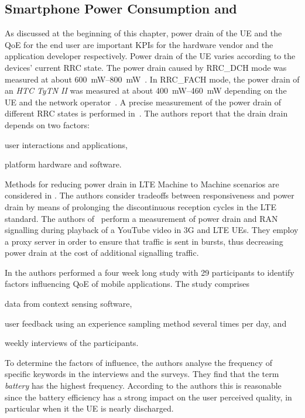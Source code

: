 \subsection{Smartphone Power Consumption and }\label{sec:network:background:energy_consumption_qoe}
As discussed at the beginning of this chapter, power drain of the \gls{UE} and the \gls{QoE} for the end user are important \glspl{KPI} for the hardware vendor and the application developer respectively.
Power drain of the \gls{UE} varies according to the devices' current \gls{RRC} state.
The power drain caused by \gls{RRC_DCH} mode was measured at about \SIrange{600}{800}{\milli\watt}~\cite{Qian2011a,Qian2010a}.
In \gls{RRC_FACH} mode, the power drain of an \emph{HTC TyTN II} was measured at about \SIrange{400}{460}{\milli\watt} depending on the \gls{UE} and the network operator~\cite{Qian2010a}.
A precise measurement of the power drain of different \gls{RRC} states is performed in~\cite{Qian2010a,Balasubramanian2009,Lee2004}. 
The authors report that the drain drain depends on two factors: 
\begin{enumerate*}
\item user interactions and applications, 
\item platform hardware and software.
\end{enumerate*}
Methods for reducing power drain in \gls{LTE} Machine to Machine scenarios are considered in \cite{Tirronen2012}.
The authors consider tradeoffs between responsiveness and power drain by means of prolonging the discontinuous reception cycles in the \gls{LTE} standard.
The authors of~\cite{Siekkinen2013} perform a measurement of power drain and \gls{RAN} signalling during playback of a YouTube video in \gls{3G} and \gls{LTE} \glspl{UE}.
They employ a proxy server in order to ensure that traffic is sent in bursts, thus decreasing power drain at the cost of additional signalling traffic.

In \cite{Ickin2012} the authors performed a four week long study with 29 participants to identify factors influencing \gls{QoE} of mobile applications.
The study comprises
\begin{enumerate*}
\item data from context sensing software,
\item user feedback using an experience sampling method several times per day, and
\item weekly interviews of the participants.
\end{enumerate*}
To determine the factors of influence, the authors analyse the frequency of specific keywords in the interviews and the surveys.
They find that the term \emph{battery} has the highest frequency.
According to the authors this is reasonable since the battery efficiency has a strong impact on the user perceived quality, in particular when it the \gls{UE} is nearly discharged.